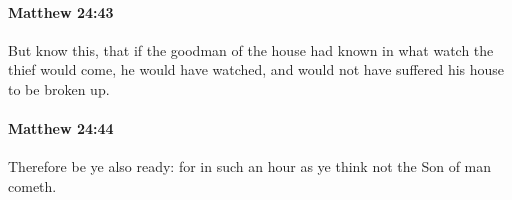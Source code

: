 		\paragraph{Matthew 24:43} %
			\label{MATTHEW-24-43}

			But know this, that if the goodman of the house had known in what watch the thief would come, he would have watched, and would not have suffered his house to be broken up.

			\begin{framed}
			\scriptsize
				\begin{compactdesc}
					\item[SBLG] 
				\end{compactdesc}
			\end{framed}

		\paragraph{Matthew 24:44} %
			\label{MATTHEW-24-44}

			Therefore be ye also ready: for in such an hour as ye think not the Son of man cometh.

